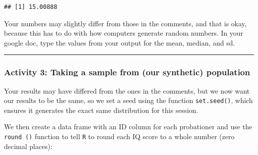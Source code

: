 \documentclass[
]{book}
\newenvironment{Shaded}{\begin{snugshade}}{\end{snugshade}}
\newcommand{\AttributeTok}[1]{\textcolor[rgb]{0.77,0.63,0.00}{#1}}
\newcommand{\CommentTok}[1]{\textcolor[rgb]{0.56,0.35,0.01}{\textit{#1}}}
\newcommand{\DecValTok}[1]{\textcolor[rgb]{0.00,0.00,0.81}{#1}}
\newcommand{\FunctionTok}[1]{\textcolor[rgb]{0.00,0.00,0.00}{#1}}
\newcommand{\NormalTok}[1]{#1}
\newcommand{\OtherTok}[1]{\textcolor[rgb]{0.56,0.35,0.01}{#1}}
\newcommand{\SpecialCharTok}[1]{\textcolor[rgb]{0.00,0.00,0.00}{#1}}
\begin{document}
\begin{verbatim}
## [1] 15.00888
\end{verbatim}

Your numbers may slightly differ from those in the comments, and that is okay, because this has to do with how computers generate random numbers. In your google doc, type the values from your output for the mean, median, and sd.

\begin{center}\rule{0.5\linewidth}{0.5pt}\end{center}

\hypertarget{activity-3-taking-a-sample-from-our-synthetic-population}{%
\subsubsection{Activity 3: Taking a sample from (our synthetic) population}\label{activity-3-taking-a-sample-from-our-synthetic-population}}

Your results may have differed from the ones in the comments, but we now want our results to be the same, so we set a seed using the function \texttt{set.seed()}, which ensures it generates the exact same distribution for this session.

We then create a data frame with an ID column for each probationer and use the \texttt{round\ ()} function to tell \texttt{R} to round each IQ score to a whole number (zero decimal places):

\begin{Shaded}
\end{Shaded}
\end{document}
